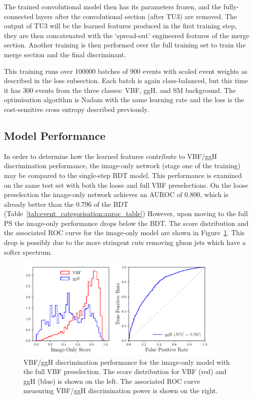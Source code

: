 The trained convolutional model then has its parameters frozen, and the fully-connected layers after the convolutional section (after TU3) are removed. 
The output of TU3 will be the learned features produced in the first training step, they are then concatenated with the `spread-out' engineered features of the merge section.
Another training is then performed over the full training set to train the merge section and the final discriminant. 

This training runs over 100000 batches of 900 events with scaled event weights as described in the loss subsection. 
Each batch is again class-balanced, but this time it has 300 events from the three classes: VBF, ggH, and SM background. 
The optimisation algorithm is Nadam with the same learning rate and the loss is the cost-sensitive cross entropy described previously. 














\subsection{Model Performance}
In order to determine how the learned features contribute to VBF/ggH discrimination performance, the image-only network (stage one of the training) may be compared to the single-step BDT model.
This performance is examined on the same test set with both the loose and full VBF preselections.
On the loose preselection the image-only network achieves an AUROC of $0.800$, which is already better than the $0.796$ of the BDT (Table~\ref{tab:event_categorisation:auroc_table}) 
However, upon moving to the full PS the image-only performance drops below the BDT. The score distribution and the associated ROC curve for the image-only model are shown in Figure~\ref{fig:event_categorisation:image_only_DCNN}. This drop is possibly due to the more stringent \pt cuts removing gluon jets which have a softer \pt spectrum.
\begin{figure}[h!]
    \centering
    \includegraphics[width=0.9\textwidth]{figures/event_selection/imgonly_DCNN_PS.pdf}
    \caption{VBF/ggH discrimination performance for the image-only model with the full VBF preselection. The score distribution for VBF (red) and ggH (blue) is shown on the left. The associated ROC curve measuring VBF/ggH discrimination power is shown on the right.}
    \label{fig:event_categorisation:image_only_DCNN}
\end{figure}

